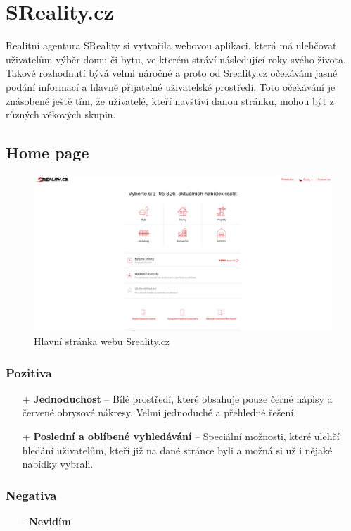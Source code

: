 \section{SReality.cz \cite{sreality}}
\label{analyza:sreality}
Realitní agentura SReality si vytvořila webovou aplikaci, která má ulehčovat uživatelům výběr domu či bytu, ve kterém stráví následující roky svého života. Takové rozhodnutí bývá velmi náročné a proto od Sreality.cz očekávám jasné podání informací a hlavně přijatelné uživatelské prostředí. Toto očekávání je znásobené ještě tím, že uživatelé, kteří navštíví danou stránku, mohou být z různých věkových skupin.\\

\subsection{Home page}
\begin{figure}[h]
    \centering
    \includegraphics[width=1.0\textwidth]{media/sreality/homepage.png}
    \caption{Hlavní stránka webu Sreality.cz}
    \label{fig:sreality:homepage}
\end{figure}
\subsubsection*{Pozitiva}
\begin{itemize}
    \item[+] \textbf{Jednoduchost} -- Bílé prostředí, které obsahuje pouze černé nápisy a červené obrysové nákresy. Velmi jednoduché a přehledné řešení.
    \item[+] \textbf{Poslední a oblíbené vyhledávání} -- Speciální možnosti, které ulehčí hledání uživatelům, kteří již na dané stránce byli a možná si už i nějaké nabídky vybrali.
\end{itemize}
\subsubsection*{Negativa}
\begin{itemize}
    \item[-] \textbf{Nevidím}
\end{itemize}


